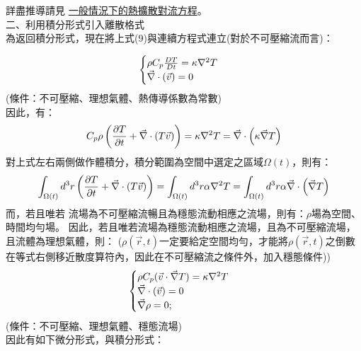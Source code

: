 \documentclass[12pt]{article}
\begin{document}
\noindent 詳盡推導請見 \href{https://heyzine.com/flip-book/3a8c229be1.html}{一般情況下的熱擴散對流方程}。\\
\newpage
\noindent 二、利用積分形式引入離散格式\\

為返回積分形式，現在將上式(9)與連續方程式連立(對於不可壓縮流而言)：

\begin{equation}
\begin{cases}
    \rho C_{p} \frac{DT}{Dt}  = \kappa \laplacian T\\
    \vec{\nabla}\cdot(\vec{v} ) = 0 
\end{cases}
\end{equation}
(條件：不可壓縮、理想氣體、熱傳導係數為常數)\\
因此，有：
\begin{equation}
\begin{split}
  C_{p}\rho\left(\frac{\partial  T}{\partial t}+\vec{\nabla}\cdot (T \vec{v})\right) = \kappa \laplacian T  = \vec{\nabla} \cdot \left(\kappa \vec{\nabla} T\right)\\
\end{split}
\end{equation}
\noindent 對上式左右兩側做作體積分，積分範圍為空間中選定之區域$\Omega(t)$，則有：
\begin{equation}
  \begin{split}
    \int_{\Omega(t)} d^{3} r \left(\frac{\partial T}{\partial t}+\vec{\nabla}\cdot (T \vec{v})\right) = \int_{\Omega(t)} d^{3} r \alpha \laplacian T  = \int_{\Omega(t)} d^{3} r \alpha \vec{\nabla} \cdot \left( \vec{\nabla} T\right)\\
  \end{split}
\end{equation}
\noindent 而，若且唯若 流場為不可壓縮流暢且為穩態流動相應之流場，則有：$\rho$場為空間、時間均勻場。
\noindent 因此，若且唯若流場為穩態流動相應之流場，且為不可壓縮流場，且流體為理想氣體，則：
\noindent ($\rho ( \vec{r} , t)$一定要給定空間均勻，才能將$\rho(\vec{r},t)$之倒數在等式右側移近散度算符內，因此在不可壓縮流之條件外，加入穩態條件))
\begin{equation}
\begin{cases}
    \rho C_{p} (\vec{v}\cdot \vec{\nabla} T)  = \kappa \laplacian T\\
    \vec{\nabla}\cdot(\vec{v} ) = 0 \\
    \vec{\nabla} \rho   = 0 ;
 \end{cases}
\end{equation}
\noindent (條件：不可壓縮、理想氣體、穩態流場)\\
因此有如下微分形式，與積分形式：
\end{document}
